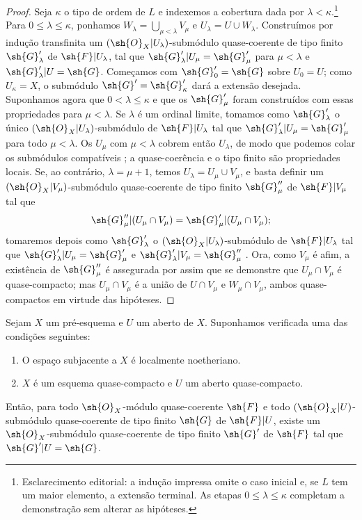 \documentclass[oneside]{amsart}
\renewcommand{\leq}{\leqslant}
\let\EGAOriginalLabel\label
\renewcommand{\label}[1]{\phantomsection\EGAOriginalLabel{#1}}
\begin{document}
\begin{proof}
Seja $\kappa$ o tipo de ordem de $L$ e indexemos a cobertura dada por
$\lambda<\kappa$.\footnote{Esclarecimento editorial: a indução impressa omite o caso inicial e, se $L$ tem um maior elemento, a extensão terminal. As etapas $0\leq\lambda\leq\kappa$ completam a demonstração sem alterar as hipóteses.}
Para $0\leq\lambda\leq\kappa$, ponhamos
$W_\lambda=\bigcup_{\mu<\lambda}V_\mu$ e $U_\lambda=U\cup W_\lambda$.
Construímos por indução transfinita um
$(\sh{O}_X|U_\lambda)$-submódulo quase-coerente de tipo finito $\sh{G}'_\lambda$ de
$\sh{F}|U_\lambda$, tal que $\sh{G}'_\lambda|U_\mu=\sh{G}'_\mu$ para $\mu<\lambda$ e
$\sh{G}'_\lambda|U=\sh{G}$.
Começamos com $\sh{G}'_0=\sh{G}$ sobre $U_0=U$; como $U_\kappa=X$, o submódulo
$\sh{G}'=\sh{G}'_\kappa$ dará a extensão desejada.
Suponhamos agora que $0<\lambda\leq\kappa$ e que os $\sh{G}'_\mu$ foram construídos
com essas propriedades para $\mu<\lambda$.
Se $\lambda$ é um ordinal limite, tomamos como $\sh{G}'_\lambda$ o único
$(\sh{O}_X|U_\lambda)$-submódulo de $\sh{F}|U_\lambda$ tal que
$\sh{G}'_\lambda|U_\mu=\sh{G}'_\mu$ para todo $\mu<\lambda$.
Os $U_\mu$ com $\mu<\lambda$ cobrem então $U_\lambda$, de modo que podemos colar
os submódulos compatíveis ; a quase-coerência e o tipo finito
são propriedades locais.
Se, ao
contrário, $\lambda=\mu+1$, temos $U_\lambda=U_\mu\cup V_\mu$, e basta definir um
$(\sh{O}_X|V_\mu)$-submódulo quase-coerente de tipo finito $\sh{G}''_\mu$ de
$\sh{F}|V_\mu$ tal que
\[
  \sh{G}''_\mu|(U_\mu\cap V_\mu)=\sh{G}'_\mu|(U_\mu\cap V_\mu);
\]
tomaremos depois como $\sh{G}'_\lambda$ o $(\sh{O}_X|U_\lambda)$-submódulo de
$\sh{F}|U_\lambda$ tal que $\sh{G}'_\lambda|U_\mu=\sh{G}'_\mu$ e
$\sh{G}'_\lambda|V_\mu=\sh{G}''_\mu$ . Ora, como $V_\mu$ é afim,
a existência de $\sh{G}''_\mu$ é assegurada por  assim que se demonstre
que $U_\mu\cap V_\mu$ é quase-compacto; mas $U_\mu\cap V_\mu$ é a união de
$U\cap V_\mu$ e $W_\mu\cap V_\mu$, ambos quase-compactos em virtude das hipóteses.
\end{proof}

\begin{theorem}[9.4.7]
\label{I.9.4.7}
Sejam $X$ um pré-esquema e $U$ um aberto de $X$. Suponhamos verificada uma das
condições seguintes:
\begin{enumerate}
  \item[{\rm(a)}] O espaço subjacente a $X$ é localmente noetheriano.
  \item[{\rm(b)}] $X$ é um esquema quase-compacto e $U$ um aberto quase-compacto.
\end{enumerate}
Então, para todo $\sh{O}_X$-módulo quase-coerente $\sh{F}$ e todo
$(\sh{O}_X|U)$-submódulo quase-coerente de tipo finito $\sh{G}$ de $\sh{F}|U$, existe
um $\sh{O}_X$-submódulo quase-coerente de tipo finito $\sh{G}'$ de $\sh{F}$ tal que
$\sh{G}'|U=\sh{G}$.
\end{theorem}
\end{document}
